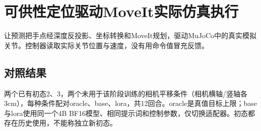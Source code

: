 
\FloatBarrier

\section{可供性定位驱动MoveIt实际仿真执行}

\label{stage:s19}

让预测把手点经深度反投影、坐标转换和MoveIt规划，驱动MuJoCo中的真实模拟关节。控制器读取实际关节位置与速度，没有用命令值冒充反馈。

\subsection{对照结果}\label{s19-detail-1}

两个已有初态2、3，两个未用于该阶段训练的相机平移条件（相机横轴/竖轴各3cm），每种条件配对oracle、base、lora，共12回合。oracle是真值目标上限；base与lora使用同一个4B BF16模型、相同提示词和控制参数，仅切换适配器。初态都存在历史使用，不能称独立新初态。

